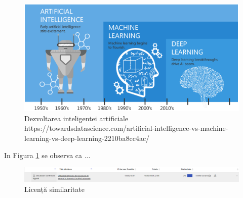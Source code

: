\documentclass[a4paper, 12pt]{report}
\begin{document}
	\begin{figure}[h]
		\begin{center}
			\includegraphics[scale=0.8]{images/AI_ML_DL.png}
		\end{center}
		\caption{Dezvoltarea inteligentei artificiale\newline
			\hspace{\linewidth}https://towardsdatascience.com/artificial-intelligence-vs-machine-learning-vs-deep-learning-2210ba8cc4ac/}
		\label{fig:AI_ML_DL}
	\end{figure}
	
	In Figura \ref{fig:AI_ML_DL} se observa ca ...
	\clearpage
   \printbibliography
   \clearpage
	\begin{figure}[H]
		\begin{center}
			\includegraphics[scale=0.4]{images/plagiat.PNG}
		\end{center}
		\caption{Licență similaritate}
		\label{fig:sim}
	\end{figure} 	
\end{document}
